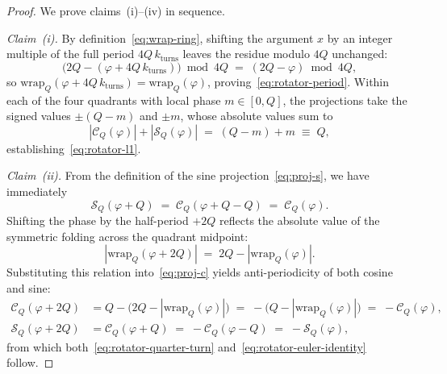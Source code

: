 \documentclass[11pt,a4paper]{article}
\theoremstyle{plain}
\theoremstyle{definition}
\begin{document}
\begin{proof}
We prove claims~(i)--(iv) in sequence.

\emph{Claim~(i).} By definition~\eqref{eq:wrap-ring}, shifting the argument $x$ by an integer multiple of the full period $4Q\,k_{\mathrm{turns}}$ leaves the residue modulo $4Q$ unchanged:
\begin{equation*}
  \bigl(2Q - (\varphi + 4Q\,k_{\mathrm{turns}})\bigr) \bmod 4Q \;=\; (2Q - \varphi) \bmod 4Q,
\end{equation*}
so $\mathrm{wrap}_Q(\varphi + 4Q\,k_{\mathrm{turns}}) = \mathrm{wrap}_Q(\varphi)$, proving~\eqref{eq:rotator-period}. Within each of the four quadrants with local phase $m \in [0, Q]$, the projections take the signed values $\pm(Q - m)$ and $\pm m$, whose absolute values sum to
\begin{equation*}
  |\mathcal{C}_Q(\varphi)| + |\mathcal{S}_Q(\varphi)| \;=\; (Q - m) + m \;\equiv\; Q,
\end{equation*}
establishing~\eqref{eq:rotator-l1}.

\emph{Claim~(ii).} From the definition of the sine projection~\eqref{eq:proj-s}, we have immediately
\begin{equation*}
  \mathcal{S}_Q(\varphi + Q) \;=\; \mathcal{C}_Q(\varphi + Q - Q) \;=\; \mathcal{C}_Q(\varphi).
\end{equation*}
Shifting the phase by the half-period $+2Q$ reflects the absolute value of the symmetric folding across the quadrant midpoint:
\begin{equation*}
  |\mathrm{wrap}_Q(\varphi + 2Q)| \;=\; 2Q - |\mathrm{wrap}_Q(\varphi)|.
\end{equation*}
Substituting this relation into~\eqref{eq:proj-c} yields anti-periodicity of both cosine and sine:
\begin{align*}
  \mathcal{C}_Q(\varphi + 2Q) &= Q - \bigl(2Q - |\mathrm{wrap}_Q(\varphi)|\bigr) \;=\; -\bigl(Q - |\mathrm{wrap}_Q(\varphi)|\bigr) \;=\; -\mathcal{C}_Q(\varphi), \\
  \mathcal{S}_Q(\varphi + 2Q) &= \mathcal{C}_Q(\varphi + Q) \;=\; -\mathcal{C}_Q(\varphi - Q) \;=\; -\mathcal{S}_Q(\varphi),
\end{align*}
from which both~\eqref{eq:rotator-quarter-turn} and~\eqref{eq:rotator-euler-identity} follow.


\end{proof}
\end{document}
